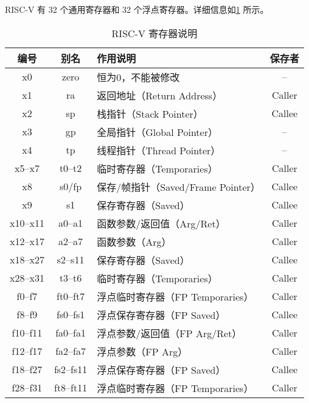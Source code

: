 RISC-V 有 32 个通用寄存器和 32 个浮点寄存器。详细信息如\cref{tab:riscv-regs} 所示。

\begin{table}[!hpt]
	\caption{RISC-V 寄存器说明}
	\label{tab:riscv-regs}
	\centering
	\begin{tabular}{@{}cclc@{}} \toprule
		\textbf{编号} & \textbf{别名} & \textbf{作用说明} & \textbf{保存者} \\
		\midrule
		x0  & zero     & 恒为0，不能被修改                  & --      \\
		x1  & ra       & 返回地址（Return Address）         & Caller  \\
		x2  & sp       & 栈指针（Stack Pointer）            & Callee  \\
		x3  & gp       & 全局指针（Global Pointer）         & --      \\
		x4  & tp       & 线程指针（Thread Pointer）         & --      \\
		x5--x7   & t0--t2    & 临时寄存器（Temporaries）          & Caller  \\
		x8  & s0/fp    & 保存/帧指针（Saved/Frame Pointer） & Callee  \\
		x9  & s1       & 保存寄存器（Saved）                & Callee  \\
		x10--x11 & a0--a1    & 函数参数/返回值（Arg/Ret）             & Caller  \\
		x12--x17 & a2--a7    & 函数参数（Arg）                        & Caller  \\
		x18--x27 & s2--s11   & 保存寄存器（Saved）                & Callee  \\
		x28--x31 & t3--t6    & 临时寄存器（Temporaries）          & Caller  \\
		\midrule
		f0--f7   & ft0--ft7  & 浮点临时寄存器（FP Temporaries）   & Caller  \\
		f8--f9   & fs0--fs1  & 浮点保存寄存器（FP Saved）         & Callee  \\
		f10--f11 & fa0--fa1  & 浮点参数/返回值（FP Arg/Ret）      & Caller  \\
		f12--f17 & fa2--fa7  & 浮点参数（FP Arg）                 & Caller  \\
		f18--f27 & fs2--fs11 & 浮点保存寄存器（FP Saved）         & Callee  \\
		f28--f31 & ft8--ft11 & 浮点临时寄存器（FP Temporaries）   & Caller  \\
		\bottomrule
	\end{tabular}
\end{table}


